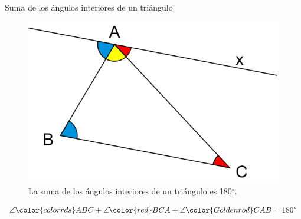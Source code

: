 \begin{infocard}{\footnotesize Suma de los ángulos interiores de un triángulo}
    \begin{figure}[H]
        \centering
        \caption{La suma de los ángulos interiores de un triángulo es 180$^\circ$.}
        \label{fig:angulos_correspondientes}
        \includegraphics[width=0.8\linewidth]{../images/angulos-internos-de-un-triangulo.png}
    \end{figure}
    \[\angle {\color{colorrds}ABC}+\angle {\color{red}BCA}+\angle {\color{Goldenrod}CAB}=180^\circ\]
\end{infocard}